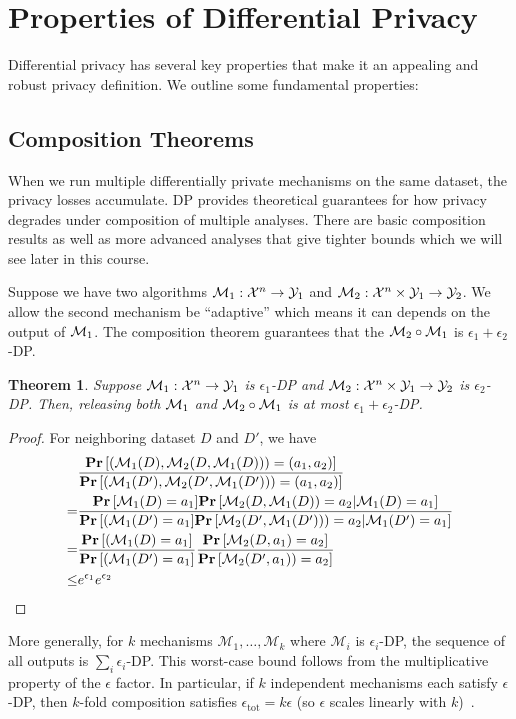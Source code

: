 \documentclass[11pt, a4paper]{article}
\newtheorem{theorem}{Theorem}
\begin{document}
\section{Properties of Differential Privacy}

Differential privacy has several key properties that make it an appealing 
and robust privacy definition. We outline some fundamental properties:

\subsection{Composition Theorems}

When we run multiple differentially private mechanisms on the same dataset,
the privacy losses accumulate.
DP provides theoretical guarantees for how privacy degrades under composition of multiple analyses.
There are basic composition results 
as well as more advanced analyses that give tighter bounds which we will see later in this course.

Suppose we have two algorithms $\mathcal{M}_1:{\cal X}^n \rightarrow {\cal Y}_1$ and $\mathcal{M}_2:{\cal X}^n\times {\cal Y}_1 \rightarrow {\cal Y}_2$.
We allow the second mechanism be ``adaptive'' which means it can depends on the output of ${\cal M}_1$.
The composition theorem guarantees that the ${\cal M}_2 \circ {\cal M}_1$ is $\epsilon_1+\epsilon_2$-DP.
\begin{theorem}
    Suppose $\mathcal{M}_1:{\cal X}^n \rightarrow {\cal Y}_1$ is $\epsilon_1$-DP and $\mathcal{M}_2:{\cal X}^n\times {\cal Y}_1 \rightarrow {\cal Y}_2$ is $\epsilon_2$-DP.
    Then, releasing both ${\cal M}_1$ and ${\cal M}_2 \circ {\cal M}_1$ is at most $\epsilon_1+\epsilon_2$-DP.
\end{theorem}
\begin{proof}
    For neighboring dataset $D$ and $D'$, we have
    \begin{align}
        & \frac{\Prob{(\cM_1(D), \cM_2(D, \cM_1(D))) = (a_1, a_2)} }{\Prob{(\cM_1(D'), \cM_2(D', \cM_1(D'))) = (a_1, a_2)}}\\
        =& \frac{\Prob{\cM_1(D)=a_1} \Prob{\cM_2(D, \cM_1(D)) = a_2|\cM_1(D)=a_1}}{\Prob{(\cM_1(D')=a_1} \Prob{\cM_2(D', \cM_1(D'))) = a_2|\cM_1(D')=a_1}}\\
        =& \frac{\Prob{(\cM_1(D)=a_1}} {\Prob{(\cM_1(D')=a_1}} \frac{\Prob{\cM_2(D, a_1) = a_2}}{\Prob{\cM_2(D', a_1)) = a_2}}\\
        \leq& e^{\epsilon_1}e^{\epsilon_2}
    \end{align}
\end{proof}
More generally, for $k$ mechanisms $\mathcal{M}_1,\dots,\mathcal{M}_k$ where $\mathcal{M}_i$ is $\epsilon_i$-DP, the sequence of all outputs is $\sum_{i}\epsilon_i$-DP.
This worst-case bound follows from the multiplicative property of the $\epsilon$ factor.
In particular, if $k$ independent mechanisms each satisfy $\epsilon$-DP,
then $k$-fold composition satisfies $\epsilon_\text{tot} = k\epsilon$ (so $\epsilon$ scales linearly with $k$)~\cite{DworkRoth2014}.
\end{document}
